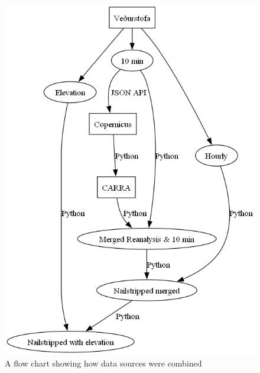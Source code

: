 \begin{figure}[h]
    \caption{A flow chart showing how data sources were combined}
    \label{fig:data_preprocessing_flow_chart}
    \includegraphics[scale = 0.5]{Figures/data-preprocessing-flow-chart-2024-04-08.png}
\end{figure}

